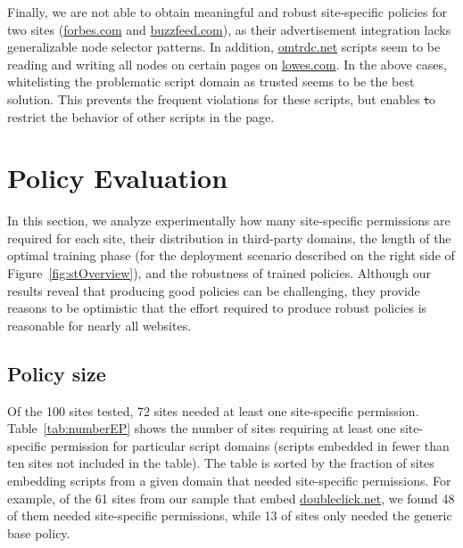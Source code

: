 Finally, we are not able to obtain meaningful and robust site-specific
policies for two sites (\url{forbes.com} and \url{buzzfeed.com}), as
their advertisement integration lacks generalizable node selector
patterns.  In addition, \url{omtrdc.net} scripts seem to be reading and
writing all nodes on certain pages on \url{lowes.com}.  In the above
cases, whitelisting the problematic script domain as trusted seems to be
the best solution.  This prevents the frequent violations for these
scripts, but enables \st to restrict the behavior of other scripts in the
page.

\section{Policy Evaluation}
\label{sec:robustness}

In this section, we analyze experimentally how many site-specific
permissions are required for each site, their distribution in
third-party domains, the length of the optimal training phase (for the
deployment scenario described on the right side of
Figure~\ref{fig:stOverview}), and the robustness of trained policies.
Although our results reveal that producing good policies can be
challenging, they provide reasons to be optimistic that the effort
required to produce robust policies is reasonable for nearly all
websites.

\subsection{Policy size} 

Of the 100 sites tested, 72 sites needed at least one site-specific
permission.  Table~\ref{tab:numberEP} shows the number of sites
requiring at least one site-specific permission for particular script
domains (scripts embedded in fewer than ten sites not included in the
table).  The table is sorted by the fraction of sites embedding scripts
from a given domain that needed site-specific permissions.  For example,
of the 61 sites from our sample that embed \url{doubleclick.net}, we
found 48 of them needed site-specific permissions, while 13 of sites
only needed the generic base policy. 

\newcommand*\rot{\rotatebox{90}}

